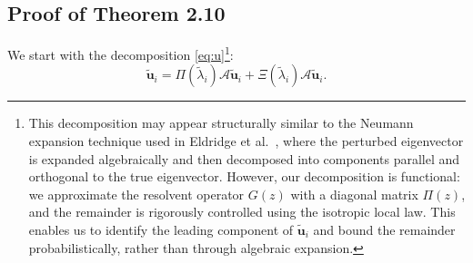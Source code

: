 \documentclass[reqno]{amsart}
\theoremstyle{plain}
\theoremstyle{definition}
\begin{document}
\subsection{Proof of Theorem 2.10}\label{sec:proofofthminfinitybd}
 We start with the decomposition \eqref{eq:u}\footnote{ This decomposition may appear structurally similar to the Neumann expansion technique used in Eldridge et al.~\cite{EBW18}, where the perturbed eigenvector is expanded algebraically and then decomposed into components parallel and orthogonal to the true eigenvector. However, our decomposition is functional: we approximate the resolvent operator \( G(z) \) with a diagonal matrix \( \Pi(z) \), and the remainder is rigorously controlled using the isotropic local law. This enables us to identify the leading component of \( \widetilde{\mathbf u}_i \) and bound the remainder probabilistically, rather than through algebraic expansion. }:
$$\widetilde{\mathbf u}_i=\Pi(\widetilde \lambda_i) \mathcal A \widetilde{\mathbf u}_i + \Xi(\widetilde \lambda_i) \mathcal A \widetilde{\mathbf u}_i.$$
\end{document}
